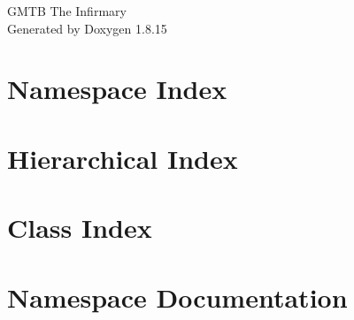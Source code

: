 \let\mypdfximage\pdfximage\def\pdfximage{\immediate\mypdfximage}\documentclass[twoside]{book}
\newcommand{\+}{\discretionary{\mbox{\scriptsize$\hookleftarrow$}}{}{}}
\newcommand{\clearemptydoublepage}{%
  \newpage{\pagestyle{empty}\cleardoublepage}%
}
\begin{document}
\hypersetup{pageanchor=false,
             bookmarksnumbered=true,
             pdfencoding=unicode
            }
\begin{titlepage}
\vspace*{7cm}
\begin{center}%
{\Large G\+M\+TB The Infirmary }\\
\vspace*{1cm}
{\large Generated by Doxygen 1.8.15}\\
\end{center}
\end{titlepage}
\clearemptydoublepage
{}
\tableofcontents
\clearemptydoublepage
{}
\hypersetup{pageanchor=true}

\chapter{Namespace Index}

\chapter{Hierarchical Index}

\chapter{Class Index}

\chapter{Namespace Documentation}

























\end{document}

